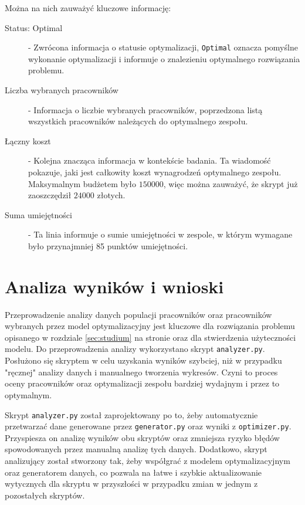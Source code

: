     Można na nich zauważyć kluczowe informację:
    \begin{description}
        \item[Status: Optimal] - Zwrócona informacja o statusie optymalizacji, \verb|Optimal| oznacza pomyślne wykonanie optymalizacji i informuje o znalezieniu optymalnego rozwiązania problemu.
        \item[Liczba wybranych pracowników] - Informacja o liczbie wybranych pracowników, poprzedzona listą wszystkich pracowników należących do optymalnego zespołu.
        \item[Łączny koszt] - Kolejna znacząca informacja w kontekście badania. Ta wiadomość pokazuje, jaki jest całkowity koszt wynagrodzeń optymalnego zespołu. Maksymalnym budżetem było $150 000$, więc można zauważyć, że skrypt już zaoszczędził $24 000$ złotych.
        \item[Suma umiejętności] - Ta linia informuje o sumie umiejętności w zespole, w którym wymagane było przynajmniej 85 punktów umiejętności.
    \end{description}
    

\section{Analiza wyników i wnioski}\label{sec:analiza}
\par Przeprowadzenie analizy danych populacji pracowników oraz pracowników wybranych przez model optymalizacyjny jest kluczowe dla rozwiązania problemu opisanego w rozdziale \ref{sec:studium} na stronie \pageref{sec:studium} oraz dla stwierdzenia użyteczności modelu. Do przeprowadzenia analizy wykorzystano skrypt \verb|analyzer.py|. Posłużono się skryptem w celu uzyskania wyników szybciej, niż w przypadku "ręcznej" analizy danych i manualnego tworzenia wykresów. Czyni to proces oceny pracowników oraz optymalizacji zespołu bardziej wydajnym i przez to optymalnym.

\par Skrypt \verb|analyzer.py| został zaprojektowany po to, żeby automatycznie przetwarzać dane generowane przez \verb|generator.py| oraz wyniki z \verb|optimizer.py|. Przyspiesza on analizę wyników obu skryptów oraz zmniejsza ryzyko błędów spowodowanych przez manualną analizę tych danych. Dodatkowo, skrypt analizujący został stworzony tak, żeby współgrać z modelem optymalizacyjnym oraz generatorem danych, co pozwala na łatwe i szybkie aktualizowanie wytycznych dla skryptu w przyszłości w przypadku zmian w jednym z pozostałych skryptów. 

